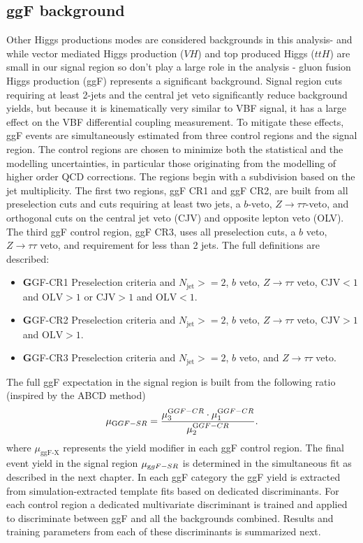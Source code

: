 \subsection{ggF background}
Other Higgs productions modes are considered backgrounds in this analysis- and while vector mediated Higgs production ($VH$) and top produced Higgs ($ttH$) are small in our signal region so don't play a large role in the analysis - gluon fusion Higgs production (ggF) represents a significant background. Signal region cuts requiring at least 2-jets and the central jet veto significantly reduce background yields, but because it is kinematically very similar to VBF signal, it has a large effect on the VBF differential coupling measurement. To mitigate these effects, ggF events are simultaneously estimated from three control regions and the signal region. The control regions are chosen to minimize both the statistical and the modelling uncertainties, in particular those originating from the modelling of higher order QCD corrections. The regions begin with a subdivision based on the jet multiplicity. The first two regions, ggF CR1 and ggF CR2, are built from all preselection cuts and cuts requiring at least two jets, a $b$-veto, $Z\rightarrow\tau\tau$-veto, and orthogonal cuts on the central jet veto (CJV) and opposite lepton veto (OLV). The third ggF control region, ggF CR3, uses all preselection cuts, a $b$ veto, $Z\rightarrow \tau\tau$ veto, and requirement for less than 2 jets. The full definitions are described:  
\begin{itemize} 
\item {\textbf GGF-CR1} Preselection criteria and $N_{ \text{jet}}>=2$, $b$ veto, $Z\rightarrow\tau\tau$ veto, $\text{CJV}<1$ and $\text{OLV}>1$ or $\text{CJV}>1$ and $\text{OLV}<1$.
\item {\textbf GGF-CR2} Preselection criteria and $N_{ \text{jet}}>=2$, $b$ veto, $Z\rightarrow\tau\tau$ veto, $\text{CJV} > 1$ and $\text{OLV} > 1$. 
\item {\textbf GGF-CR3} Preselection criteria and $N_{ \text{jet}}>=2$, $b$ veto, and $Z\rightarrow\tau\tau$ veto. 
\end{itemize} 
The full ggF expectation in the signal region is built from the following ratio (inspired by the ABCD method) 
\begin{equation}
	\mu_{{\text GGF-SR}} = \frac{\mu^{{\text GGF-CR}}_{3} \cdot\mu^{{\text GGF-CR}}_{1}}{ \mu^{{\text GGF-CR}}_{2}}.
\end{equation}
where $\mu_{\text{ggF-X}}$ represents the yield modifier in each ggF control region. The final event yield in the signal region $\mu_{{\text ggF-SR}}$ is determined in the simultaneous fit as described in the next chapter. In each ggF category the ggF yield is extracted from simulation-extracted template fits based on dedicated discriminants. For each control region a dedicated multivariate discriminant is trained and applied to discriminate between ggF and all the backgrounds combined. Results and training parameters from each of these discriminants is summarized next.

